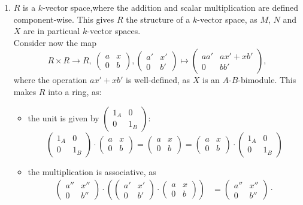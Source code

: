 \setcounter{sol}{3}
\begin{sol}
  \begin{enumerate}
    \item $R$ is a $k$-vector space,where the addition and scalar multiplication are defined component-wise. This gives $R$ the structure of a $k$-vector space, as $M$, $N$ and $X$ are in particual $k$-vector spaces.\\
    Consider now the map
    \[
    R\times R \to R,~\begin{pmatrix}a&x\\0&b\end{pmatrix}, \begin{pmatrix}a'&x'\\0&b'\end{pmatrix}\mapsto \begin{pmatrix} aa'&ax'+xb'\\0&bb'\end{pmatrix},
    \]
    where the operation $ax'+xb'$ is well-defined, as $X$ is an $A$-$B$-bimodule. This makes $R$ into a ring, as:
    \begin{itemize}
      \item the unit is given by $\begin{pmatrix}1_A&0\\0&1_B\end{pmatrix}$:
      \[
      \begin{pmatrix}1_A&0\\0&1_B\end{pmatrix} \cdot \begin{pmatrix}a&x\\0&b\end{pmatrix} = \begin{pmatrix}a&x\\0&b\end{pmatrix} = \begin{pmatrix}a&x\\0&b\end{pmatrix}\cdot \begin{pmatrix}1_A&0\\0&1_B\end{pmatrix}
      \]
      \item the multiplication is associative, as
      \begin{align*}
      \begin{pmatrix}a''&x''\\0&b''\end{pmatrix}\cdot \left( \begin{pmatrix}a'&x'\\0&b'\end{pmatrix}\cdot  \begin{pmatrix}a&x\\0&b\end{pmatrix}\right)&= \begin{pmatrix}a''&x''\\0&b''\end{pmatrix}\cdot

\end{align*}
\end{itemize}
\end{enumerate}
\end{sol}
